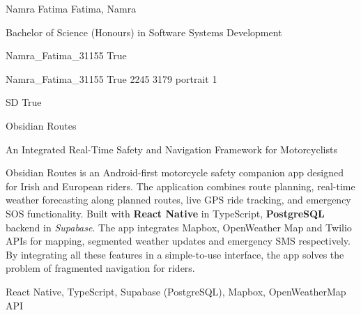 \documentclass[twoside]{report}
\begin{document}
\begingroup{}\relax



\def\Key{Namra_Fatima_31155}

{Namra Fatima}
{Fatima, Namra}

{Bachelor of Science (Honours) in Software Systems Development}

{Namra_Fatima_31155}
{True}

{Namra_Fatima_31155}
{True}
{2245}
{3179}
{portrait}
{1}

{SD}
{True}

{Obsidian Routes}

{An Integrated Real-Time Safety and Navigation Framework for Motorcyclists}

{Obsidian Routes is an Android-first motorcycle safety companion app designed for Irish and European riders. The application combines route planning, real-time weather forecasting along planned routes, live GPS ride tracking, and emergency SOS functionality. Built with {\bfseries React Native} in TypeScript, {\bfseries PostgreSQL} backend in {\em Supabase}. The app integrates Mapbox, OpenWeather Map and Twilio APIs for mapping, segmented weather updates and emergency SMS respectively. By integrating all these features in a simple-to-use interface, the app solves the problem of fragmented navigation for riders.}

{React Native, TypeScript, Supabase (PostgreSQL), Mapbox, OpenWeatherMap API}
\end{document}
